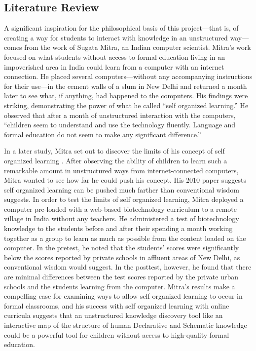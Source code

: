 \documentclass[man, 12pt, floatsintext, donotrepeattitle]{apa6}
\begin{document}
\subsection{Literature Review}
A significant inspiration for the philosophical basis of this project---that is,
of creating a way for students to interact with knowledge in an unstructured
way---comes from the work of Sugata Mitra, an Indian computer scientist.
Mitra's work focused on what students without access to formal education living
in an impoverished area in India could learn from a computer with an internet
connection.  He placed several computers---without any accompanying instructions
for their use---in the cement walls of a slum in New Delhi and returned a month
later to see what, if anything, had happened to the computers.   His findings
were striking, demonstrating the power of what he called ``self organized
learning.''  He observed that after a month of unstructured interaction with
the computers, ``children seem to understand and use the technology fluently.
Language and formal education do not seem to make any significant difference.''
\parencite[221]{Mitra2001}

In a later study, Mitra set out to discover the limits of his concept of self
organized learning \parencite{Mitra2010}.  After observing the
ability of children to learn such a remarkable amount in unstructured ways
from internet-connected computers, Mitra wanted to
see how far he could push his concept.  His 2010 paper suggests self organized
learning can be pushed much farther than conventional wisdom suggests.  In
order to test the limits of
self organized learning, Mitra deployed a computer pre-loaded with a web-based
biotechnology curriculum to a remote village in India without any teachers.
He administered a test of biotechnology knowledge to the students before and
after their spending a month working together as a group to learn as much as
possible from the content loaded on the computer.  In the pretest, he noted
that the students' scores were significantly below the scores reported by private
schools in affluent areas of New Delhi, as conventional wisdom would suggest.
In the posttest, however, he found that there
are minimal differences between the test scores reported by the private urban
schools and the students learning from the computer.  Mitra's results make a
compelling case for examining ways to allow self organized learning to occur
in formal classrooms, and his success with self organized learning with online
curricula suggests that an unstructured knowledge discovery tool like an
interactive map of the structure of human Declarative and Schematic knowledge
could be a powerful tool for children without access to high-quality formal
education.
\end{document}
